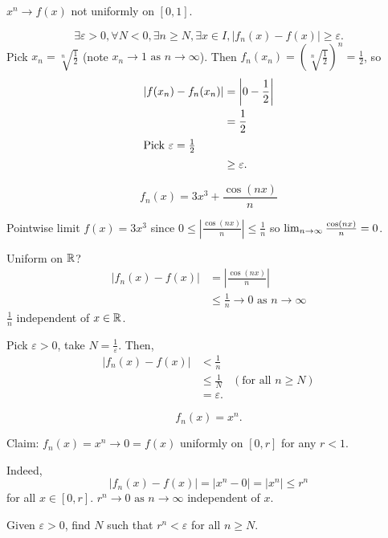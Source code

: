 \documentclass[10pt, a4paper]{article}
\newcommand{\limas}[3][n]{#2 \to #3 \text{ as } #1 \to \infty}
\begin{document}
\begin{example}
    $x ^ n \to f(x)$ not uniformly on $[0, 1]$.
    \begin{solution}
        \[
        \exists \varepsilon > 0, \forall N < 0, \exists n \geq N, \exists x \in I, |f_n(x) - f(x)| \geq \varepsilon.
        \]
        Pick $x_n = \sqrt[n]{\frac{1}{2}}$
        (note $\limas{x_n}{1}$).
        Then $f_n(x_n) = \left(\sqrt[n]{\frac{1}{2}}\right) ^ n = \frac{1}{2}$,
        so
        \begin{align*}
            |f(x_n) - f_n(x_n)| &= \left|0 - \frac{1}{2}\right| \\
            &= \frac{1}{2} \\
            \intertext{Pick $\varepsilon = \frac{1}{2}$}
            &\geq \varepsilon.
        \end{align*}
    \end{solution}
\end{example}

\begin{example}
    \[
    f_n(x) = 3x ^ 3 + \frac{\cos(nx)}{n}
    \]
    
    \begin{solution}
        Pointwise limit $f(x) = 3x ^ 3$ since $0 \leq \left|\frac{\cos(nx)}{n}\right| \leq \frac{1}{n}$ so $\lim_{n \rightarrow \infty}\frac{\cos(nx)}{n} = 0$.

        Uniform on $\mathbb{R}$?
        \begin{align*}
            |f_n(x) - f(x)| &= \left|\frac{\cos(nx)}{n}\right| \\
            &\leq \limas{\frac{1}{n}}{0}
        \end{align*}
        $\frac{1}{n}$ independent of $x \in \mathbb{R}$.

        Pick $\varepsilon > 0$,
        take $N = \frac{1}{\varepsilon}$.
        Then,
        \begin{align*}
            |f_n(x) - f(x)| &< \frac{1}{n} \\
            &\leq \frac{1}{N} &(\text{for all $n \geq N$})\\
            &= \varepsilon.
        \end{align*}
    \end{solution}
\end{example}

\begin{example}
    \[
    f_n(x) = x ^ n.
    \]

    \begin{solution}
        Claim:
        $f_n(x) = x ^ n \to 0 = f(x)$ uniformly on $[0, r]$ for any $r < 1$.

        Indeed,
        \[
        |f_n(x) - f(x)| = |x ^ n - 0| = |x ^ n| \leq r ^ n
        \]
        for all $x \in [0, r]$.
        $\limas{r ^ n}{0}$ independent of $x$.

        Given $\varepsilon > 0$,
        find $N$ such that $r ^ n < \varepsilon$ for all $n \geq N$.
    \end{solution}
\end{example}
\end{document}
